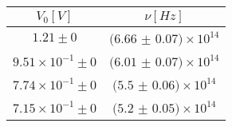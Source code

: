 \begin{tabular}{cc}
\hline
	$V_0[V]$ & $\nu[Hz]$\\ 
\hline
	$1.21\pm 0$ & $(6.66$ $\pm$ $0.07)\times 10^{14}$ \\
	$9.51\times 10^{-1}\pm 0$ & $(6.01$ $\pm$ $0.07)\times 10^{14}$ \\
	$7.74\times 10^{-1}\pm 0$ & $(5.5$ $\pm$ $0.06)\times 10^{14}$ \\
	$7.15\times 10^{-1}\pm 0$ & $(5.2$ $\pm$ $0.05)\times 10^{14}$ \\
\hline
\end{tabular}
